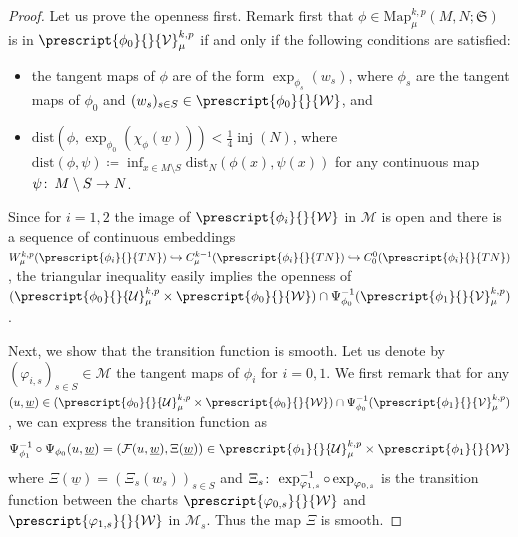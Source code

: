 \documentclass{article}
\numberwithin{equation}{section}        %
\theoremstyle{bfnote}
\theoremstyle{definition}
\theoremstyle{bfremark}
\newcommand{\col}{\colon \thinspace}        %
\newcommand{\Map}{\mathrm{Map}}             %
\DeclareMathOperator{\inj}{inj}                 %
\begin{document}
\begin{proof}
    Let us prove the openness first. Remark first that $\phi \in \Map^{k,p}_\mu(M,N;\mathfrak{S})$ is in $\prescript{\phi_0}{}{\mathcal{V}}^{k,p}_\mu$ if and only if the following conditions are satisfied:
    \begin{itemize}
        \item the tangent maps of $\phi$ are of the form $\exp_{\phi_s}(w_s)$, where $\phi_s$ are the tangent maps of $\phi_0$ and $(w_s)_{s \in S} \in \prescript{\phi_0}{}{\mathcal{W}}$, and
        \item $\mathrm{dist}(\phi, \exp_{\phi_0}(\chi_\phi(\underline{w}))) < \frac{1}{4}\inj(N)$, where $\mathrm{dist}(\phi,\psi) \coloneqq \inf_{x \in M \setminus S} \mathrm{dist}_N(\phi(x),\psi(x))$ for any continuous map $\psi \col M \setminus S \to N$. 
    \end{itemize}
    Since for $i = 1,2$ the image of $\prescript{\phi_i}{}{\mathcal{W}}$ in $\mathcal{M}$ is open and there is a sequence of continuous embeddings $W^{k,p}_\mu(\prescript{\phi_i}{}{TN}) \hookrightarrow C^{k-1}_\mu(\prescript{\phi_i}{}{TN}) \hookrightarrow C^0_0(\prescript{\phi_i}{}{TN})$, the triangular inequality easily implies the openness of $(\prescript{\phi_0}{}{\mathcal{U}}^{k,p}_\mu \times \prescript{\phi_0}{}{\mathcal{W}}) \cap \Psi_{\phi_0}^{-1}(\prescript{\phi_1}{}{\mathcal{V}}^{k,p}_\mu)$.
    
    Next, we show that the transition function is smooth. Let us denote by $(\varphi_{i,s})_{s \in S} \in \mathcal{M}$ the tangent maps of $\phi_i$ for $i = 0,1$. We first remark that for any $(u,\underline{w}) \in (\prescript{\phi_0}{}{\mathcal{U}}^{k,p}_\mu \times \prescript{\phi_0}{}{\mathcal{W}}) \cap \Psi_{\phi_0}^{-1}(\prescript{\phi_1}{}{\mathcal{V}}^{k,p}_\mu)$ , we can express the transition function as
    \begin{equation*}
        \Psi_{\phi_1}^{-1} \circ \Psi_{\phi_0}(u,\underline{w}) = (\mathcal{F}(u,\underline{w}),\Xi(\underline{w})) \in \prescript{\phi_1}{}{\mathcal{U}}^{k,p}_\mu \times \prescript{\phi_1}{}{\mathcal{W}}
    \end{equation*}
    where $\Xi(\underline{w}) = (\Xi_s(w_s))_{s \in S}$ and $\Xi_s \col \exp_{\varphi_{1,s}}^{-1} \circ \exp_{\varphi_{0,s}}$ is the transition function between the charts $\prescript{\varphi_{0,s}}{}{\mathcal{W}}$ and $\prescript{\varphi_{1,s}}{}{\mathcal{W}}$ in $\mathcal{M}_s$. Thus the map $\Xi$ is smooth.


\end{proof}
\end{document}
